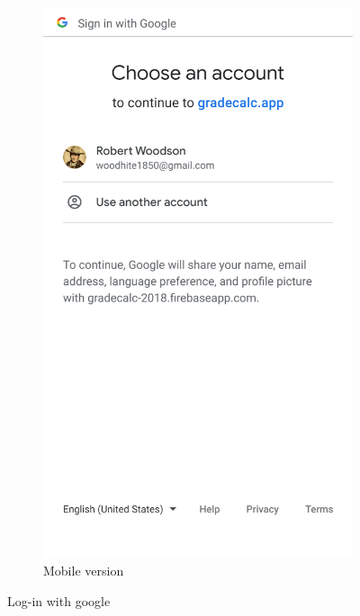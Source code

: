 \begin{figure}[ht!]
\begin{subfigure}[b]{0.243\textwidth-0.1cm}
        \includegraphics[frame,width=\textwidth]{media/screenshots/screenshot-login-google.png}
        \caption{Mobile version}
    \end{subfigure}
    \caption{Log-in with google}
    \label{fig:login-google}
\end{figure}

\vfill

